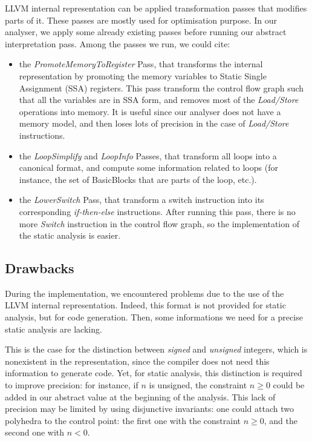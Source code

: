 \documentclass[a4paper,english,titlepage,11pt]{report}
\begin{document}
LLVM internal representation can be applied transformation passes that modifies
parts of it. These passes are mostly used for optimisation purpose. In our
analyser, we apply some already existing passes before running our 
abstract interpretation pass. Among the passes we run, we could cite:
\begin{itemize}
\item the \emph{PromoteMemoryToRegister} Pass, that transforms the internal
representation by promoting the memory variables to Static Single Assignment
(SSA) registers. This pass transform the control flow graph such that all the
variables are in SSA form, and removes most of the \emph{Load/Store} operations
into memory. It is useful since our analyser does not have a memory model, and
then loses lots of precision in the case of \emph{Load/Store} instructions.
\item the \emph{LoopSimplify} and \emph{LoopInfo} Passes, that transform all loops into a canonical
format, and compute some information related to loops (for instance, the set of
BasicBlocks that are parts of the loop, etc.).
\item the \emph{LowerSwitch} Pass, that transform a switch instruction into its
corresponding \emph{if-then-else} instructions. After running this pass, there
is no more \emph{Switch} instruction in the control flow graph, so the
implementation of the static analysis is easier.
\end{itemize}


\subsection{Drawbacks}

During the implementation, we encountered problems due to the use of the LLVM
internal representation. Indeed, this format is not provided for static
analysis, but for code generation. Then, some informations we need for a precise
static analysis are lacking.

This is the case for the distinction between \emph{signed} and \emph{unsigned}
integers, which is nonexistent in the representation, since the compiler does
not
need this information to generate code. Yet, for static analysis, 
this distinction is required to improve precision:
for instance, if $n$ is unsigned, the constraint $n \geq 0$ could be added in
	our abstract value at the beginning of the analysis.
	This lack of precision may be limited by using disjunctive invariants: one
	could attach two polyhedra to the control point: the first one with the
	constraint $n \geq 0$, and the second one with $n < 0$.
\end{document}
